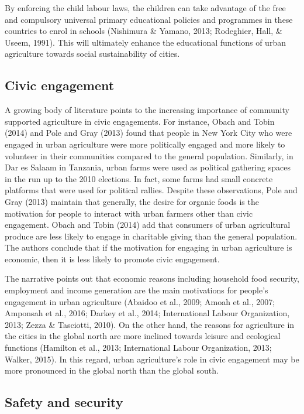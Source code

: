 By enforcing the child labour laws, the children can take advantage of the free and compulsory universal primary educational policies and programmes in these countries to enrol in schools (Nishimura \& Yamano, 2013; Rodeghier, Hall, \& Useem, 1991). This will ultimately enhance the educational functions of urban agriculture towards social sustainability of cities.

\subsection{Civic engagement}

A growing body of literature points to the increasing importance of community supported agriculture in civic engagements. For instance, Obach and Tobin (2014) and Pole and Gray (2013) found that people in New York City who were engaged in urban agriculture were more politically engaged and more likely to volunteer in their communities compared to the general population. Similarly, in Dar es Salaam in Tanzania, urban farms were used as political gathering spaces in the run up to the 2010 elections. In fact, some farms had small concrete platforms that were used for political rallies. Despite these observations, Pole and Gray (2013) maintain that generally, the desire for organic foods is the motivation for people to interact with urban farmers other than civic engagement. Obach and Tobin (2014) add that consumers of urban agricultural produce are less likely to engage in charitable giving than the general population. The authors conclude that if the motivation for engaging in urban agriculture is economic, then it is less likely to promote civic engagement.

The narrative points out that economic reasons including household food security, employment and income generation are the main motivations for people's engagement in urban agriculture (Abaidoo et al., 2009; Amoah et al., 2007; Amponsah et al., 2016; Darkey et al., 2014; International Labour Organization, 2013; Zezza \& Tasciotti, 2010). On the other hand, the reasons for agriculture in the cities in the global north are more inclined towards leisure and ecological functions (Hamilton et al., 2013; International Labour Organization, 2013; Walker, 2015). In this regard, urban agriculture's role in civic engagement may be more pronounced in the global north than the global south.

\subsection{Safety and security}


